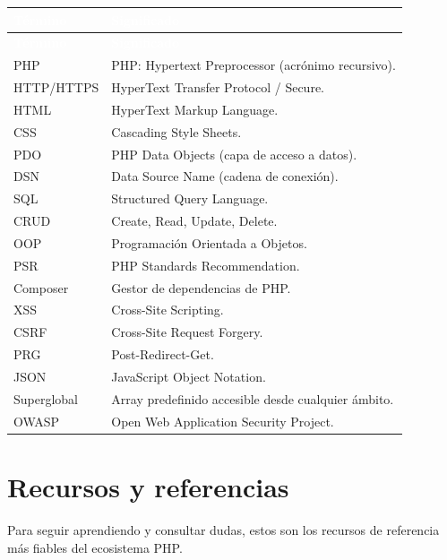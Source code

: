 \documentclass[11pt]{article}
\begin{document}
{\renewcommand{\arraystretch}{1.25}
\begin{longtable}{>{\raggedright\arraybackslash}p{3cm} >{\raggedright\arraybackslash}p{12.4cm}}
\rowcolor{phpazul}\textcolor{white}{\textbf{Término}} & \textcolor{white}{\textbf{Significado}} \\
\endfirsthead
\rowcolor{phpazul}\textcolor{white}{\textbf{Término}} & \textcolor{white}{\textbf{Significado}} \\
\endhead
\ttfamily\color{phpazul}PHP & PHP: Hypertext Preprocessor (acrónimo recursivo). \\ \hline
\ttfamily\color{phpazul}HTTP/HTTPS & HyperText Transfer Protocol / Secure. \\ \hline
\ttfamily\color{phpazul}HTML & HyperText Markup Language. \\ \hline
\ttfamily\color{phpazul}CSS & Cascading Style Sheets. \\ \hline
\ttfamily\color{phpazul}PDO & PHP Data Objects (capa de acceso a datos). \\ \hline
\ttfamily\color{phpazul}DSN & Data Source Name (cadena de conexión). \\ \hline
\ttfamily\color{phpazul}SQL & Structured Query Language. \\ \hline
\ttfamily\color{phpazul}CRUD & Create, Read, Update, Delete. \\ \hline
\ttfamily\color{phpazul}OOP & Programación Orientada a Objetos. \\ \hline
\ttfamily\color{phpazul}PSR & PHP Standards Recommendation. \\ \hline
\ttfamily\color{phpazul}Composer & Gestor de dependencias de PHP. \\ \hline
\ttfamily\color{phpazul}XSS & Cross-Site Scripting. \\ \hline
\ttfamily\color{phpazul}CSRF & Cross-Site Request Forgery. \\ \hline
\ttfamily\color{phpazul}PRG & Post-Redirect-Get. \\ \hline
\ttfamily\color{phpazul}JSON & JavaScript Object Notation. \\ \hline
\ttfamily\color{phpazul}Superglobal & Array predefinido accesible desde cualquier ámbito. \\ \hline
\ttfamily\color{phpazul}OWASP & Open Web Application Security Project. \\ \hline
\end{longtable}}
\section{Recursos y referencias}
Para seguir aprendiendo y consultar dudas, estos son los recursos de referencia más fiables del ecosistema PHP.
\end{document}
